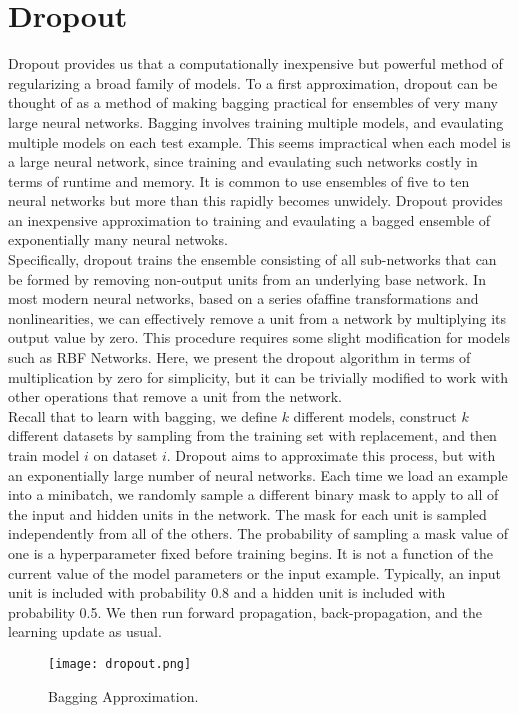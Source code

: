 \documentclass[11pt]{article}
\begin{document}
\section{Dropout}
\hspace*{1cm} Dropout provides us that a computationally inexpensive but powerful method of regularizing a broad family of models. To a first approximation, dropout can be thought of as a method of making bagging practical for ensembles of very many large neural networks. Bagging involves training multiple models, and evaulating multiple models on each test example. This seems impractical when each model is a large neural network, since training and evaulating such networks costly in terms of runtime and memory. It is common to use ensembles of five to ten neural networks but more than this rapidly becomes unwidely. Dropout provides an inexpensive approximation to training and evaulating a bagged ensemble of exponentially many neural netwoks.\\
Specifically, dropout trains the ensemble consisting of all sub-networks that
can be formed by removing non-output units from an underlying base network. In most modern neural networks, based on a series ofaffine transformations and nonlinearities, we can effectively remove a unit from a network by multiplying its output value by zero. This procedure requires some slight modification for models such as RBF Networks. Here, we present
the dropout algorithm in terms of multiplication by zero for simplicity, but it can be trivially modified to work with other operations that remove a unit from the network. \\
Recall that to learn with bagging, we define $k$ different models, construct $k$ different datasets by sampling from the training set with replacement, and then train model $i$ on dataset $i$. Dropout aims to approximate this process, but with an exponentially large number of neural networks. Each time we load an example into a minibatch, we randomly sample a different binary mask to apply to all of the input and hidden units in the network. The mask for each unit is sampled independently from all of the others. The probability of sampling a mask value of one is a hyperparameter fixed before training begins. It is not a function of the current value of the model parameters or the input example. Typically, an input unit is included with probability 0.8 and a hidden unit is included with probability 0.5. We then run forward propagation, back-propagation, and the
learning update as usual.
\begin{figure}[H]
\centering
\texttt{[image: dropout.png]}
\caption{Bagging Approximation.}
\label{fig:figure3}
\end{figure}\pagebreak
\end{document}
